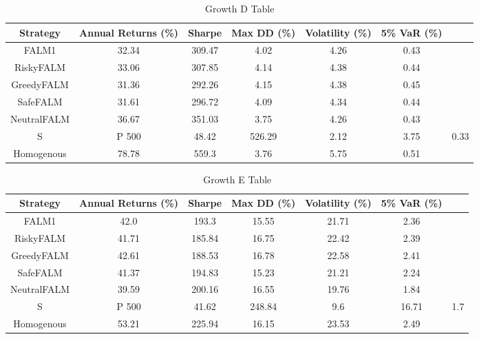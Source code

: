 \begin{table}[]
    \centering
    \caption{Growth D Table}
    \begin{tabular}{|c|c|c|c|c|c|c|}
        \hline
        Strategy & Annual Returns (\%) & Sharpe & Max \ac{DD} (\%) & Volatility (\%)& 5\% \ac{VaR} (\%) \\
        \hline
        FALM1 & 32.34 & 309.47 & 4.02 & 4.26 & 0.43 \\
        RiskyFALM & 33.06 & 307.85 & 4.14 & 4.38 & 0.44 \\
        GreedyFALM & 31.36 & 292.26 & 4.15 & 4.38 & 0.45 \\
        SafeFALM & 31.61 & 296.72 & 4.09 & 4.34 & 0.44 \\
        NeutralFALM & 36.67 & 351.03 & 3.75 & 4.26 & 0.43 \\
        S&P 500 & 48.42 & 526.29 & 2.12 & 3.75 & 0.33 \\
        Homogenous & 78.78 & 559.3 & 3.76 & 5.75 & 0.51 \\
        \hline
    \end{tabular}
    \label{tab:growth_d_table}
\end{table}

\begin{table}[]
    \centering
    \caption{Growth E Table}
    \begin{tabular}{|c|c|c|c|c|c|c|}
        \hline
        Strategy & Annual Returns (\%) & Sharpe & Max \ac{DD} (\%) & Volatility (\%)& 5\% \ac{VaR} (\%) \\
        \hline
        FALM1 & 42.0 & 193.3 & 15.55 & 21.71 & 2.36 \\
        RiskyFALM & 41.71 & 185.84 & 16.75 & 22.42 & 2.39 \\
        GreedyFALM & 42.61 & 188.53 & 16.78 & 22.58 & 2.41 \\
        SafeFALM & 41.37 & 194.83 & 15.23 & 21.21 & 2.24 \\
        NeutralFALM & 39.59 & 200.16 & 16.55 & 19.76 & 1.84 \\
        S&P 500 & 41.62 & 248.84 & 9.6 & 16.71 & 1.7 \\
        Homogenous & 53.21 & 225.94 & 16.15 & 23.53 & 2.49 \\
        \hline
    \end{tabular}
    \label{tab:growth_e_table}
\end{table}

